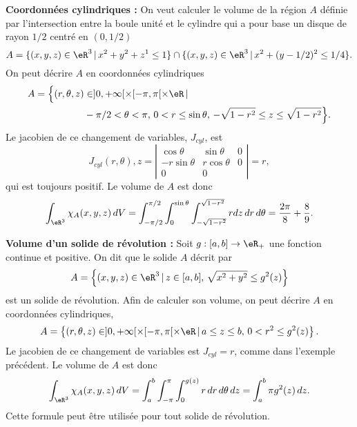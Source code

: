 \begin{example}
\textbf{Coordonnées cylindriques : }On veut calculer le volume de la région $A$ définie par  l'intersection entre la boule unité et le cylindre qui a pour base un disque de rayon $1/2$ centré en $(0, 1/2)$
\[
A=\{(x,y,z) \in\eR^3 \,\vert\, x^2+y^2+z^1\leq 1\}\cap\{(x,y,z) \in \eR^3\,\vert\, x^2+(y-1/2)^2\leq 1/4\}.
\]
On peut décrire $A$ en coordonnées cylindriques
\begin{equation}
  \begin{aligned}
    A=\Big\{(r,\theta,z) &\in ]0, +\infty[\times [-\pi,\pi[\times \eR\,\vert\,\\
& -\pi/2<\theta<\pi, \, 0<r\leq \sin\theta, \, -\sqrt{1-r^2}\leq z\leq\sqrt{1-r^2} \Big\}.
  \end{aligned}
\end{equation}
Le jacobien de ce changement de variables,  $J_{cyl}$, est
\begin{equation}
 J_{cyl}(r, \theta), z= \left\vert\begin{array}{ccc}
\cos \theta & \sin \theta & 0\\
-r\sin \theta  & r\cos \theta &0 \\
0&0&
\end{array}\right\vert= r,
\end{equation}
qui est toujours positif. Le volume de $A$ est donc
\[
\int_{\eR^3}\chi_{A}(x,y,z)\, dV=\int_{-\pi/2}^{\pi/2}\int_0^{\sin\theta}\int_{-\sqrt{1-r^2}}^{\sqrt{1-r^2}} r dz\,dr\,d\theta=\frac{2\pi}{8}+\frac{8}{9}.  
\] 
\end{example}

\begin{example}
\textbf{Volume d'un solide de révolution : }Soit $g:[a,b]\to\eR_+$ une fonction continue et positive. On dit que le solide $A$ décrit par
\[
A=\left\{(x,y,z)\in\eR^3\, \vert \, z\in[a,b], \,\sqrt{x^2+y^2}\leq g^2(z) \right\}
\]
est un solide de révolution. Afin de calculer son volume, on peut décrire $A$ en coordonnées cylindriques, 
\[
A=\left\{(r,\theta,z) \in ]0, +\infty[\times [-\pi,\pi[\times \eR\,\vert\, a\leq z\leq b, \, 0<r^2\leq g^2(z) \right\}.
\]
Le jacobien de ce changement de variables est  $J_{cyl}=r$, comme dans l'exemple précédent. Le volume de $A$ est donc
\[
\int_{\eR^3}\chi_{A}(x,y,z)\, dV=\int_a^{b}\int_{-\pi}^{\pi}\int_{0}^{g(z)} r  \,dr\,d\theta\, dz=\int_a^{b} \pi g^2(z) \, dz.
\] 
Cette formule peut être utilisée pour tout solide de révolution. 
\end{example}

